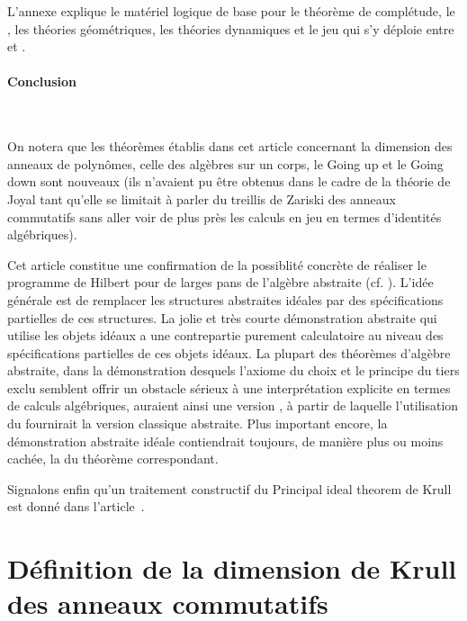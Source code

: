 \noindent L'annexe explique le matériel logique de base pour le théorème de complétude, le \tcg, les théories géométriques, les théories dynamiques et
le jeu qui s'y déploie entre \clama et \coma. 

\paragraph{Conclusion}~

\noindent On notera que les théorèmes \cofs établis dans cet article
concernant la dimension des anneaux de polynômes, celle des algèbres \pf
sur un corps, le Going up et le Going down sont nouveaux (ils n'avaient pu
être obtenus dans le cadre de la théorie de Joyal tant qu'elle se
limitait à parler du treillis de Zariski des anneaux commutatifs sans aller voir de plus près
les calculs en jeu en termes d'identités algébriques). 


\smallskip  Cet article constitue une confirmation de la possiblité concrète de 
réaliser le programme de Hilbert pour de larges pans de l'algèbre 
abstraite 
(cf.  \cite{cp,clr,kl,lom95,lom97,lom98,lom,lom99,lom99a,lq99}). 
L'idée générale est de remplacer les structures abstraites idéales 
par des spécifications partielles de ces structures.
La jolie et très courte démonstration abstraite qui utilise les objets idéaux 
a une contrepartie purement calculatoire au niveau des spécifications 
partielles de ces objets idéaux.
La plupart des théorèmes d'algèbre abstraite, dans la démonstration 
desquels l'axiome du choix et le principe du tiers exclu semblent offrir 
un obstacle sérieux à une interprétation explicite en termes de 
calculs algébriques, auraient ainsi une version \cov, à partir de 
laquelle l'utilisation du \tcg fournirait la version classique abstraite. 
Plus important encore, la démonstration abstraite idéale contiendrait toujours, 
de manière plus ou moins cachée, la \prco du théorème \cof 
correspondant. 


\ms 
Signalons enfin qu'un traitement constructif du Principal ideal theorem de 
Krull est donné
dans l'article~\cite{cl}.

\patchcmd{\sectionmark}{\MakeUppercase}{}{}{}

\section{Définition \cov de la dimension de Krull des anneaux 
commutatifs} 
\label{secKrA}


